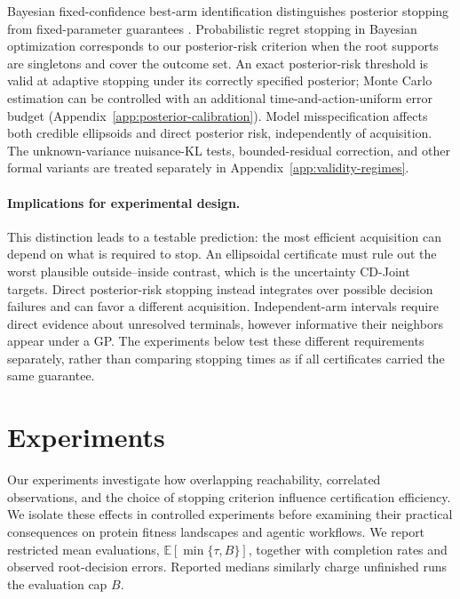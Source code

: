 \documentclass{article}
\theoremstyle{plain}
\theoremstyle{definition}
\begin{document}
Bayesian fixed-confidence best-arm identification distinguishes
posterior stopping from fixed-parameter guarantees
\citep{shang2020bayesian,jang2024bayesian}.
Probabilistic regret stopping in Bayesian optimization
\citep{wilson2024stopping} corresponds to our posterior-risk
criterion when the root supports are singletons and cover
the outcome set. An exact posterior-risk threshold is valid
at adaptive stopping under its correctly specified posterior;
Monte Carlo estimation can be controlled with an additional
time-and-action-uniform error budget
(Appendix~\ref{app:posterior-calibration}).
Model misspecification affects both credible ellipsoids and
direct posterior risk, independently of acquisition. The
unknown-variance nuisance-KL tests, bounded-residual correction,
and other formal variants are treated separately in
Appendix~\ref{app:validity-regimes}.

\paragraph{Implications for experimental design.}
This distinction leads to a testable prediction: the most
efficient acquisition can depend on what is required to stop.
An ellipsoidal certificate must rule out the worst plausible
outside--inside contrast, which is the uncertainty CD-Joint
targets. Direct posterior-risk stopping instead integrates
over possible decision failures and can favor a different
acquisition. Independent-arm intervals require direct evidence
about unresolved terminals, however informative their neighbors
appear under a GP. The experiments below test these different
requirements separately, rather than comparing stopping times
as if all certificates carried the same guarantee.

\section{Experiments}
\suppressfloats[t]
\label{sec:results}\label{sec:exp-setup}

Our experiments investigate how overlapping reachability, correlated
observations, and the choice of stopping criterion influence
certification efficiency. We isolate these effects in controlled
experiments before examining their practical consequences on protein
fitness landscapes and agentic workflows. We report restricted mean
evaluations, $\mathbb E[\min\{\tau,B\}]$, together with completion
rates and observed root-decision errors. Reported medians similarly
charge unfinished runs the evaluation cap $B$.
\end{document}
